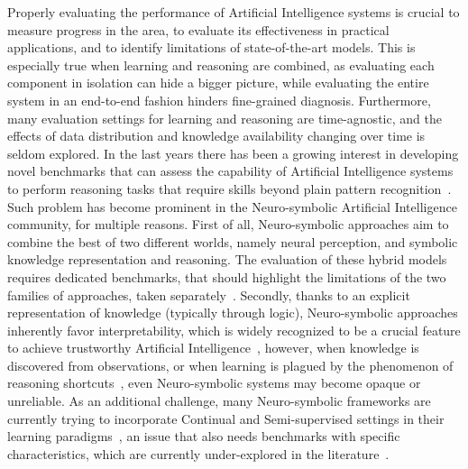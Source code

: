 Properly evaluating the performance of Artificial Intelligence systems is crucial to measure progress in the area, to evaluate its effectiveness in practical applications, and to identify limitations of state-of-the-art models. This is especially true when learning and reasoning are combined, as evaluating each component in isolation can hide a bigger picture, while evaluating the entire system in an end-to-end fashion hinders fine-grained diagnosis. Furthermore, many evaluation settings for learning and reasoning are time-agnostic, and the effects of data distribution and knowledge availability changing over time is seldom explored.
In the last years there has been a growing interest in developing novel benchmarks that can assess the capability of Artificial Intelligence systems to perform reasoning tasks that require skills beyond plain pattern recognition~\cite{chollet2019measure}.
Such problem has become prominent in the Neuro-symbolic Artificial Intelligence community, for multiple reasons. First of all, Neuro-symbolic approaches aim to combine the best of two different worlds, namely neural perception, and symbolic knowledge representation and reasoning. The evaluation of these hybrid models requires dedicated benchmarks, that should highlight the limitations of the two families of approaches, taken separately~\cite{ott2023think}. 
Secondly, thanks to an explicit representation of knowledge (typically through logic), Neuro-symbolic approaches inherently favor interpretability, which is widely recognized to be a crucial feature to achieve trustworthy Artificial Intelligence~\cite{kaur2022trustworthy}, however, when knowledge is discovered from observations, or when learning is plagued by the phenomenon of reasoning shortcuts~\cite{marconato2023neuro}, even Neuro-symbolic systems may become opaque or unreliable.
As an additional challenge, many Neuro-symbolic frameworks are currently trying to incorporate Continual and Semi-supervised settings in their learning paradigms~\cite{DBLP:conf/icml/MarconatoBFCPT23,liu2023weakly,yin2022visual}, an issue that also needs benchmarks with specific characteristics, which are currently under-explored in the literature~\cite{manhaeve2024benchmarking}.

